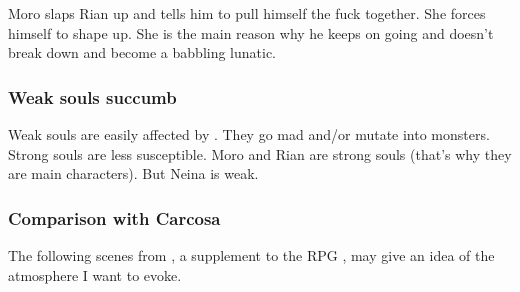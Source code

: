 Moro slaps Rian up and tells him to pull himself the fuck together. 
She forces himself to shape up.
She is the main reason why he keeps on going and doesn't break down and become a babbling lunatic. 





\subsubsection{Weak souls succumb}
Weak souls are easily affected by . 
They go mad and/or mutate into monsters. 
Strong souls are less susceptible. 
Moro and Rian are strong souls (that's why they are main characters).
But Neina is weak. 





\subsubsection{Comparison with Carcosa}
The following scenes from \cite{RPG:CallofCthulhu:GreatOldOnes}, a supplement to the RPG \cite{RPG:CallofCthulhu}, may give an idea of the atmosphere I want to evoke. 

